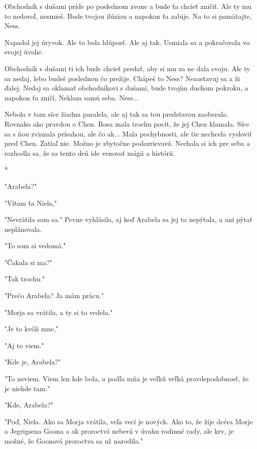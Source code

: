 \documentclass{book}
\begin{document}
Obchodník s dušami príde po poslednom zvone a bude ťa chcieť zničiť. Ale ty mu to nedovoľ, nesmieš. Bude tvojou ilúziou a napokon ťa zabije. Na to si pamätajte, Ness.

Napadol jej úryvok. Ale to bola hlúposť. Ale aj tak. Usmiala sa a pokračovala vo svojej úvahe.

Obchodník s dušami ti ich bude chcieť predať, aby si mu za ne dala svoju. Ale ty sa nedaj, lebo budeš poslednou čo prežije. Chápeš to Ness? Nezastavuj sa a ži ďalej. Nedaj sa oklamať obchodníkovi s dušami, bude tvojím duchom pokroku, a napokon ťa zničí. Neklam samú seba. Ness...

Nebola v tom síce žiadna paralela, ale aj tak sa tou predstavou zaoberala. Rovnako ako pravdou o Chen. Rosa mala trochu pocit, že jej Chen klamala. Síce sa s ňou zviazala prísahou, ale čo ak... Mala pochybnosti, ale tie nechcela vysloviť pred Chen. Zatiaľ nie. Možno je zbytočne podozrievavá. Nechala si ich pre seba a rozhodla sa, že sa tento deň ide venovať mágii a histórii.

\begin{center}

*

\end{center}

"$ $Arabela?"$ $ 

"$ $Vítam ťa Niela,"$ $ 

"$ $Nevrátila som sa."$ $  Pevne vyhlásila, aj keď Arabela sa jej to nepýtala, a ani pýtať neplánovala.

"$ $To som si vedomá."$ $ 

"$ $Čakala si ma?"$ $ 

"$ $Tak trochu."$ $ 

"$ $Prečo Arabela? Ja mám prácu."$ $ 

"$ $Morja sa vrátila, a ty si to vedela."$ $ 

"$ $Je to kvôli mne,"$ $ 

"$ $Aj to viem."$ $ 

"$ $Kde je, Arabela?"$ $ 

"$ $To neviem. Viem len kde bola, a podľa mňa je veľkú veľká pravdepodobnosť, že je niekde tam."$ $ 

"$ $Kde, Arabela?"$ $ 

"$ $Poď, Niela. Ako sa Morja vrátila, veľa vecí je nových. Ako to, že žije dcéra Morje a Jegrigsena Goona a ak proroctvá neberú v úvahu rodinné rady, ale krv, je možné, že Goonová proroctva sa už narodila."$ $ 
\end{document}
